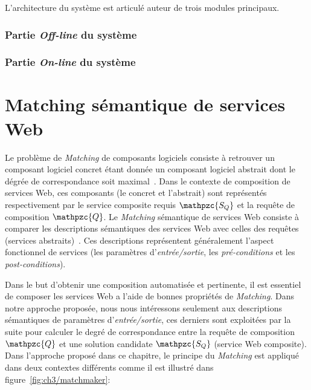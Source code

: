 L'architecture du système est articulé auteur de trois modules
principaux.
\subsubsection{Partie \emph{Off-line} du système}
\label{sec:presentation-architecture-online}

\subsubsection{Partie \emph{On-line} du système}
\label{sec:presentation-architecture-online}

\newpage
\section{Matching sémantique de services Web}
\label{sec:ch3/matching}

Le problème de \emph{Matching} de composants logiciels consiste à
retrouver un composant logiciel concret étant donnée un composant
logiciel abstrait dont le dégrée de correspondance soit
maximal~\cite{lecue2008composition}. Dans le contexte de composition
de services Web, ces composants (le concret et l'abstrait) sont
représentés respectivement par le service composite requis {\large
  $\mathpzc{S_Q}$} et la requête de composition {\large
  $\mathpzc{Q}$}. Le \emph{Matching} sémantique de services Web
consiste à comparer les descriptions sémantiques des services Web avec
celles des requêtes (services
abstraits)~\cite{paolucci2002semantic}. Ces descriptions représentent
généralement l'aspect fonctionnel de services (les paramètres
d'\emph{entrée/sortie}, les \emph{pré-conditions} et les
\emph{post-conditions}).\medskip

Dans le but d'obtenir une composition automatisée et pertinente, il
est essentiel de composer les services Web a l'aide de bonnes
propriétés de \emph{Matching}. Dans notre approche proposée, nous nous
intéressons seulement aux descriptions sémantiques de paramètres
d'\emph{entrée/sortie}, ces derniers sont exploitées par la suite pour
calculer le degré de correspondance entre la requête de composition
{\large $\mathpzc{Q}$} et une solution candidate {\large
  $\mathpzc{S_Q}$} (service Web composite). Dans l'approche proposé
dans ce chapitre, le principe du \emph{Matching} est appliqué dans
deux contextes différents comme il est illustré dans
figure~\ref{fig:ch3/matchmaker}:



